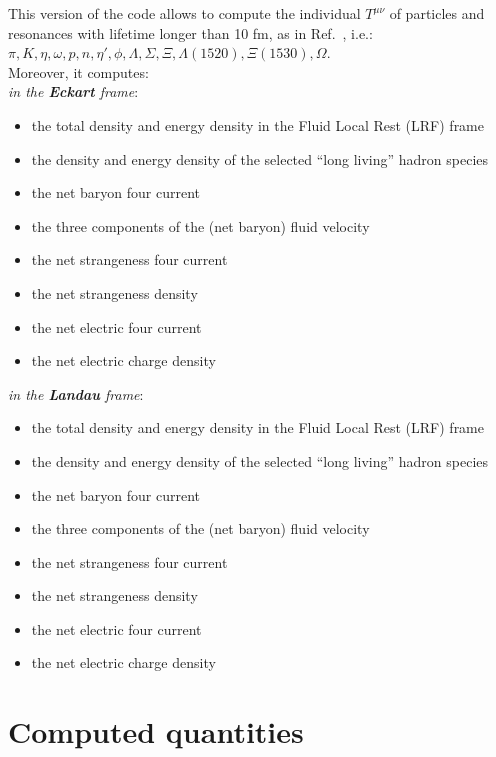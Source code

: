 \documentclass[12pt, a4paper]{article}
\begin{document}
This version of the code allows to compute the individual $T^{\mu\nu}$ of particles and resonances with lifetime longer than 10 fm, as in Ref.~\cite{Huovinen:2007xh}, i.e.: $\pi, K, \eta, \omega, p, n, \eta', \phi, \Lambda, \Sigma, \Xi, \Lambda(1520), \Xi(1530), \Omega$.\\
Moreover, it computes:\\
\emph{in the \textbf{Eckart} frame}:
\begin{itemize}
	\item the total density and energy density in the Fluid Local Rest (LRF) frame 
	\item the density and energy density of the selected ``long living'' hadron species
	\item the net baryon four current
	\item the three components of the (net baryon) fluid velocity
	\item the net strangeness four current
	\item the net strangeness density
	\item the net electric four current
	\item the net electric charge density
\end{itemize}
\noindent
\emph{in the \textbf{Landau} frame}:
\begin{itemize}
	\item the total density and energy density in the Fluid Local Rest (LRF) frame 
	\item the density and energy density of the selected ``long living'' hadron species
	\item the net baryon four current
	\item the three components of the (net baryon) fluid velocity
	\item the net strangeness four current
	\item the net strangeness density
	\item the net electric four current
	\item the net electric charge density
\end{itemize}

	
\section{Computed quantities}
\end{document}
